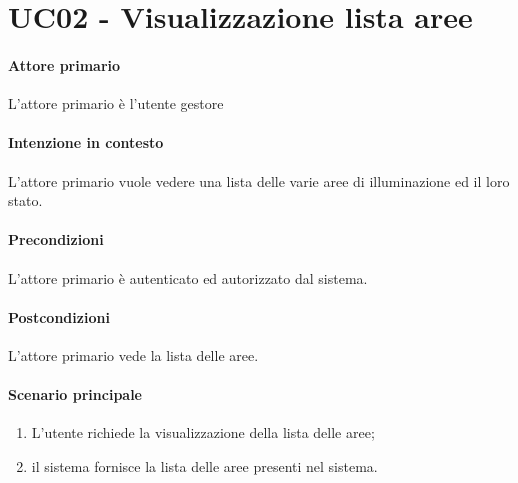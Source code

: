 \section{UC02 - Visualizzazione lista aree}\label{uc:02}

\paragraph{Attore primario} L'attore primario è l'utente gestore
\paragraph{Intenzione in contesto} L'attore primario vuole vedere una lista delle varie aree di illuminazione ed il loro stato.

\paragraph{Precondizioni} L'attore primario è autenticato ed autorizzato dal sistema.

\paragraph{Postcondizioni} L'attore primario vede la lista delle aree.

\paragraph{Scenario principale}

\begin{enumerate}
    \item L'utente richiede la visualizzazione della lista delle aree;
    \item il sistema fornisce la lista delle aree presenti nel sistema.
\end{enumerate}

